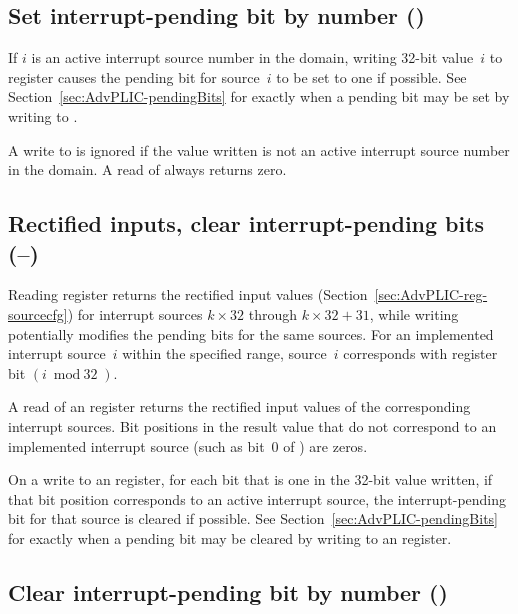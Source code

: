 \subsection{Set interrupt-pending bit by number ()}

If $i$ is an active interrupt source number in the domain, writing
\mbox{32-bit} value~$i$ to register  causes the pending bit
for source~$i$ to be set to one if possible.
See Section~\ref{sec:AdvPLIC-pendingBits} for exactly when a pending
bit may be set by writing to .

A write to  is ignored if the value written is not an
active interrupt source number in the domain.
A read of  always returns zero.

\subsection{%
Rectified inputs, clear interrupt-pending bits
 (--)%
}

Reading register  returns the rectified input
values (Section~\ref{sec:AdvPLIC-reg-sourcecfg}) for interrupt sources
$k\times\mbox{32}$ through ${k\times\mbox{32}+\mbox{31}}$, while
writing  potentially modifies the pending bits for
the same sources.
For an implemented interrupt source~$i$ within the specified range,
source~$i$ corresponds with register bit ${(i\bmod\mbox{32})}$.

A read of an  register returns the rectified input values
of the corresponding interrupt sources.
Bit positions in the result value that do not correspond to an
implemented interrupt source (such as bit~0 of )
are zeros.

On a write to an  register, for each bit that is one in
the \mbox{32-bit} value written, if that bit position corresponds to an
active interrupt source, the interrupt-pending bit for that source is
cleared if possible.
See Section~\ref{sec:AdvPLIC-pendingBits} for exactly when a pending
bit may be cleared by writing to an  register.

\subsection{Clear interrupt-pending bit by number ()}


